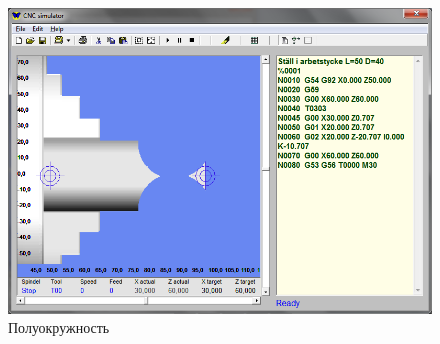 \begin{figure}[ht]
\centering
	\includegraphics[width=.9\linewidth]{6.png}
    \caption{Полуокружность\label{fig:half}}
\end{figure}

\clearpage
